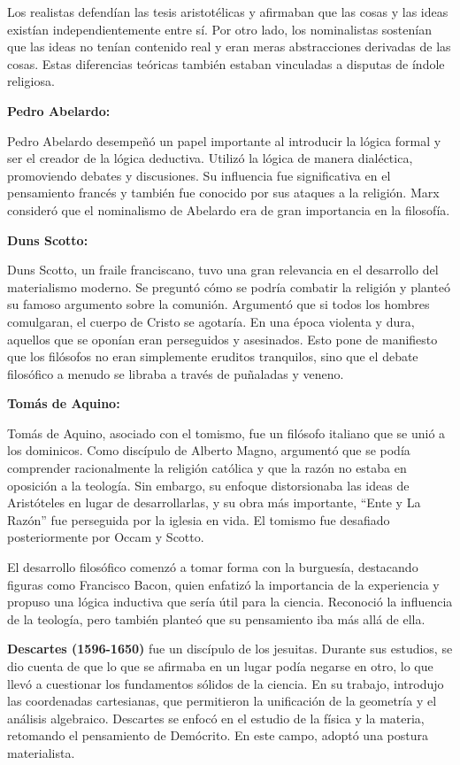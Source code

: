 \documentclass[
  jou,
  floatsintext,
  longtable,
  a4paper,
  nolmodern,
  notxfonts,
  notimes,
  12pt,
  colorlinks=true,linkcolor=blue,citecolor=blue,urlcolor=blue]{apa7}
\begin{document}
Los realistas defendían las tesis aristotélicas y afirmaban que las
cosas y las ideas existían independientemente entre sí. Por otro lado,
los nominalistas sostenían que las ideas no tenían contenido real y eran
meras abstracciones derivadas de las cosas. Estas diferencias teóricas
también estaban vinculadas a disputas de índole religiosa.

\textbf{Pedro Abelardo:}

Pedro Abelardo desempeñó un papel importante al introducir la lógica
formal y ser el creador de la lógica deductiva. Utilizó la lógica de
manera dialéctica, promoviendo debates y discusiones. Su influencia fue
significativa en el pensamiento francés y también fue conocido por sus
ataques a la religión. Marx consideró que el nominalismo de Abelardo era
de gran importancia en la filosofía.

\textbf{Duns Scotto:}

Duns Scotto, un fraile franciscano, tuvo una gran relevancia en el
desarrollo del materialismo moderno. Se preguntó cómo se podría combatir
la religión y planteó su famoso argumento sobre la comunión. Argumentó
que si todos los hombres comulgaran, el cuerpo de Cristo se agotaría. En
una época violenta y dura, aquellos que se oponían eran perseguidos y
asesinados. Esto pone de manifiesto que los filósofos no eran
simplemente eruditos tranquilos, sino que el debate filosófico a menudo
se libraba a través de puñaladas y veneno.

\textbf{Tomás de Aquino:}

Tomás de Aquino, asociado con el tomismo, fue un filósofo italiano que
se unió a los dominicos. Como discípulo de Alberto Magno, argumentó que
se podía comprender racionalmente la religión católica y que la razón no
estaba en oposición a la teología. Sin embargo, su enfoque distorsionaba
las ideas de Aristóteles en lugar de desarrollarlas, y su obra más
importante, ``Ente y La Razón'' fue perseguida por la iglesia en vida.
El tomismo fue desafiado posteriormente por Occam y Scotto.

El desarrollo filosófico comenzó a tomar forma con la burguesía,
destacando figuras como Francisco Bacon, quien enfatizó la importancia
de la experiencia y propuso una lógica inductiva que sería útil para la
ciencia. Reconoció la influencia de la teología, pero también planteó
que su pensamiento iba más allá de ella.

\textbf{Descartes (1596-1650)} fue un discípulo de los jesuitas. Durante
sus estudios, se dio cuenta de que lo que se afirmaba en un lugar podía
negarse en otro, lo que llevó a cuestionar los fundamentos sólidos de la
ciencia. En su trabajo, introdujo las coordenadas cartesianas, que
permitieron la unificación de la geometría y el análisis algebraico.
Descartes se enfocó en el estudio de la física y la materia, retomando
el pensamiento de Demócrito. En este campo, adoptó una postura
materialista.
\end{document}
